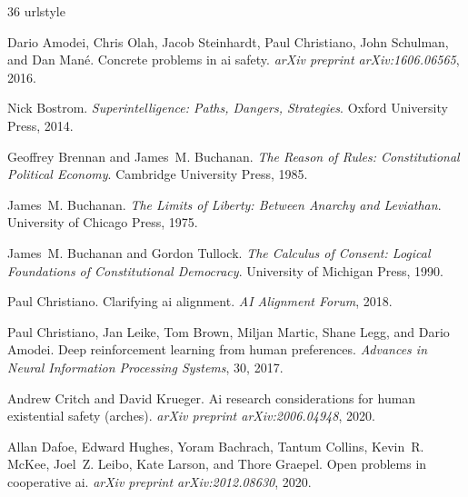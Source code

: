 \documentclass[12pt]{article}
\begin{document}
\clearpage
\begin{thebibliography}{36}
\providecommand{\natexlab}[1]{#1}
\providecommand{\url}[1]{\texttt{#1}}
\expandafter\ifx\csname urlstyle\endcsname\relax
  \providecommand{\doi}[1]{doi: #1}\else
  \providecommand{\doi}{doi: \begingroup \urlstyle{rm}\Url}\fi

Dario Amodei, Chris Olah, Jacob Steinhardt, Paul Christiano, John Schulman, and
  Dan Man{\'e}.
\newblock Concrete problems in ai safety.
\newblock \emph{arXiv preprint arXiv:1606.06565}, 2016.

Nick Bostrom.
\newblock \emph{Superintelligence: Paths, Dangers, Strategies}.
\newblock Oxford University Press, 2014.

Geoffrey Brennan and James~M. Buchanan.
\newblock \emph{The Reason of Rules: Constitutional Political Economy}.
\newblock Cambridge University Press, 1985.

James~M. Buchanan.
\newblock \emph{The Limits of Liberty: Between Anarchy and Leviathan}.
\newblock University of Chicago Press, 1975.

James~M. Buchanan and Gordon Tullock.
\newblock \emph{The Calculus of Consent: Logical Foundations of Constitutional
  Democracy}.
\newblock University of Michigan Press, 1990.

Paul Christiano.
\newblock Clarifying ai alignment.
\newblock \emph{AI Alignment Forum}, 2018.

Paul Christiano, Jan Leike, Tom Brown, Miljan Martic, Shane Legg, and Dario
  Amodei.
\newblock Deep reinforcement learning from human preferences.
\newblock \emph{Advances in Neural Information Processing Systems}, 30, 2017.

Andrew Critch and David Krueger.
\newblock Ai research considerations for human existential safety (arches).
\newblock \emph{arXiv preprint arXiv:2006.04948}, 2020.

Allan Dafoe, Edward Hughes, Yoram Bachrach, Tantum Collins, Kevin~R. McKee,
  Joel~Z. Leibo, Kate Larson, and Thore Graepel.
\newblock Open problems in cooperative ai.
\newblock \emph{arXiv preprint arXiv:2012.08630}, 2020.


\end{thebibliography}
\end{document}
